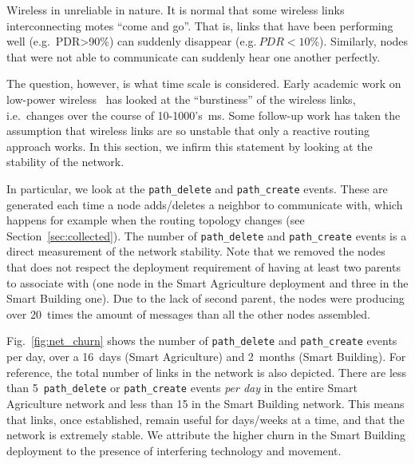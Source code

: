 \documentclass{elsarticle}
\newcommand{\building}            {Smart Building\xspace}
\newcommand{\agri}                {Smart Agriculture\xspace}
\newcommand{\pathcreate}          {{\tt path\_create}\xspace}
\newcommand{\pathdelete}          {{\tt path\_delete}\xspace}
\begin{document}
Wireless in unreliable in nature.
It is normal that some wireless links interconnecting motes ``come and go''.
That is, links that have been performing well (e.g.~PDR>90\%) can suddenly disappear (e.g.$~PDR<10$\%).
Similarly, nodes that were not able to communicate can suddenly hear one another perfectly.


The question, however, is what time scale is considered.
Early academic work on low-power wireless~\cite{srinivasan08beta} has looked at the ``burstiness'' of the wireless links, i.e.~changes over the course of 10-1000's~ms.
Some follow-up work has taken the assumption that wireless links are so unstable that only a reactive routing approach works.
In this section, we infirm this statement by looking at the stability of the network.


In particular, we look at the \pathdelete and \pathcreate events.
These are generated each time a node adds/deletes a neighbor to communicate with, which happens for example when the routing topology changes (see Section~\ref{sec:collected}).
The number of \pathdelete and \pathcreate events is a direct measurement of the network stability.
Note that we removed the nodes that does not respect the deployment requirement of having at least two parents to associate with (one node in the \agri deployment and three in the \building one).
Due to the lack of second parent, the nodes were producing over 20~times the amount of messages than all the other nodes assembled.


Fig.~\ref{fig:net_churn} shows the number of \pathdelete and \pathcreate events per day, over a 16~days (\agri) and 2~months (\building).
For reference, the total number of links in the network is also depicted.
There are less than 5~\pathdelete or \pathcreate events \textit{per day} in the entire \agri network and less than 15 in the \building network.
This means that links, once established, remain useful for days/weeks at a time, and that the network is extremely stable.
We attribute the higher churn in the \building deployment to the presence of interfering technology and movement.
\end{document}
